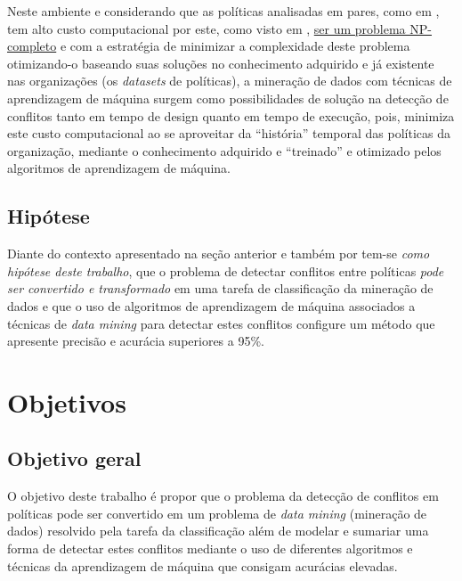 \documentclass[
	12pt,				%
	openright,			%
	twoside,			%
	a4paper,			%
	english,			%
	french,				%
	spanish,			%
	brazil				%
	]{abntex2}
\begin{document}
Neste ambiente e considerando que as políticas analisadas em pares, como em , tem alto custo computacional por este, como visto em , \underline{ser um problema NP-completo} e com a estratégia de minimizar a complexidade deste problema otimizando-o baseando suas soluções no conhecimento adquirido e já existente nas organizações (os \textit{datasets} de políticas), a mineração de dados com técnicas de aprendizagem de máquina surgem como possibilidades de solução na detecção de conflitos tanto em tempo de design quanto em tempo de execução, pois, minimiza este custo computacional ao se aproveitar da ``história'' temporal das políticas da organização, mediante o conhecimento adquirido e ``treinado'' e otimizado pelos algoritmos de aprendizagem de máquina.

\subsection{Hipótese}\label{hipótese}
Diante do contexto apresentado na seção anterior e também por  tem-se \textit{como hipótese deste trabalho}, que o problema de detectar conflitos entre políticas\textit{ pode ser convertido e transformado} em uma tarefa de classificação da mineração de dados e que o uso de algoritmos de aprendizagem de máquina associados a técnicas de \textit{data mining} para detectar estes conflitos configure um método que apresente precisão e acurácia superiores a 95\%.

\section{Objetivos}\label{objetivos}
\subsection{Objetivo geral}\label{objetivo_geral}
O objetivo deste trabalho é propor que o problema da detecção de conflitos em políticas pode ser convertido em um problema de \textit{data mining} (mineração de dados) resolvido pela tarefa da classificação além de modelar e sumariar uma forma de detectar estes conflitos mediante o uso de diferentes algoritmos e técnicas da aprendizagem de máquina que consigam acurácias elevadas.
\end{document}
